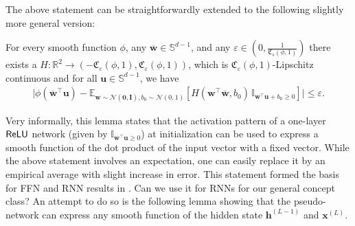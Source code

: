 The above statement can be straightforwardly extended to the following slightly more general version: 
\begin{lemma}\label{lemma:Expressfunction_fNN}
    For every smooth function $\phi$, any $\overline{\mathbf{w}} \in \mathbb{S}^{d-1}$, and any $\varepsilon \in \left(0, \frac{1}{\mathfrak{C}_{s}\left(\phi, 1 \right)}\right)$ there exists a $H:\mathbb{R}^2 \to \left(- 
	\mathfrak{C}_\varepsilon\left(\phi,  1\right),  \mathfrak{C}_\varepsilon\left(\phi,  1\right)\right)$, which is $ \mathfrak{C}_\varepsilon\left(\phi, 1\right)$-Lipschitz continuous and for all $\mathbf{u} \in  \mathbb{S}^{d-1}$, we have
	$$
	\begin{array}{l}
		\Big|\phi(\overline{\mathbf{w}}^{\top} \mathbf{u}) - \mathbb{E}_{\mathbf{w} \sim \mathcal{N}(\mathbf{0}, \mathbf{I}), b_0 \sim \mathcal{N}(0, 1)} [{H(\mathbf{w}^{\top} \overline{\mathbf{w}}, b_0)} \,\mathbb{I}_{\mathbf{w}^{\top} \mathbf{u} + b_0 \geq 0} ]  \Big| \leq \varepsilon.
	\end{array}
	$$
\end{lemma} 
Very informally, this lemma states that the activation pattern of a one-layer $\mathsf{ReLU}$ network (given by $\mathbb{I}_{\mathbf{w}^{\top} \mathbf{u} \geq 0}$) at initialization can be used to express a smooth function of the dot product of the input vector with a fixed vector. While the above statement involves an expectation, one can easily replace it by an empirical average with slight increase in error. 
This statement formed the basis for FFN and RNN results in \cite{allen2019learning, allen2019can}. 
Can we use it for RNNs for our general concept class? An attempt to do so is the following lemma showing that the pseudo-network can express any smooth function of the hidden state $\mathbf{h}^{(L-1)}$ and $\mathbf{x}^{(L)}$. 

